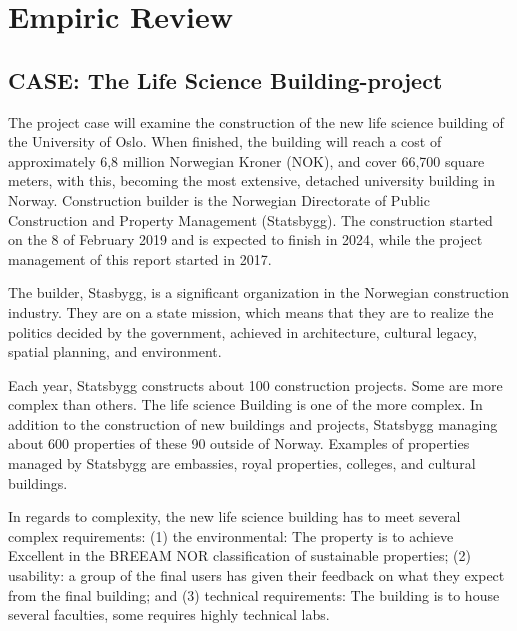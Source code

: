 
\chapter{Empiric Review}
\section{CASE: The Life Science Building-project}
The project case will examine the construction of the new life science building of the University of Oslo. When finished, the building will reach a cost of approximately 6,8 million Norwegian Kroner (NOK), and cover 66,700 square meters, with this, becoming the most extensive, detached university building in Norway. Construction builder is the Norwegian Directorate of Public Construction and Property Management (Statsbygg). The construction started on the 8 of February 2019 and is expected to finish in 2024, while the project management of this report started in 2017.

The builder, Stasbygg, is a significant organization in the Norwegian construction industry. They are on a state mission, which means that they are to realize the politics decided by the government, achieved in architecture, cultural legacy, spatial planning, and environment. 

Each year, Statsbygg constructs about 100 construction projects. Some are more complex than others. The life science Building is one of the more complex. In addition to the construction of new buildings and projects, Statsbygg managing about 600 properties of these 90 outside of Norway. Examples of properties managed by Statsbygg are embassies, royal properties, colleges, and cultural buildings. 

In regards to complexity, the new life science building has to meet several complex requirements: (1) the environmental: The property is to achieve Excellent in the BREEAM NOR classification of sustainable properties; (2) usability: a group of the final users has given their feedback on what they expect from the final building; and (3) technical requirements: The building is to house several faculties, some requires highly technical labs.

